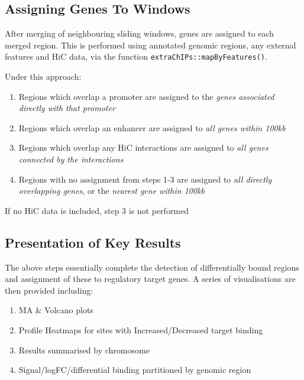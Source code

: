 \documentclass[
]{book}
\providecommand{\tightlist}{%
  \setlength{\itemsep}{0pt}\setlength{\parskip}{0pt}}
\begin{document}
\hypertarget{assigning-genes-to-windows}{%
\subsection*{Assigning Genes To Windows}\label{assigning-genes-to-windows}}

After merging of neighbouring sliding windows, genes are assigned to each merged region.
This is performed using annotated genomic regions, any external features and HiC data, via the function \texttt{extraChIPs::mapByFeatures()}.

Under this approach:

\begin{enumerate}
\def\labelenumi{\arabic{enumi}.}
\tightlist
\item
  Regions which overlap a promoter are assigned to the \emph{genes associated directly with that promoter}
\item
  Regions which overlap an enhancer are assigned to \emph{all genes within 100kb}
\item
  Regions which overlap any HiC interactions are assigned to \emph{all genes connected by the interactions}
\item
  Regions with no assignment from steps 1-3 are assigned to \emph{all directly overlapping genes}, or the \emph{nearest gene within 100kb}
\end{enumerate}

If no HiC data is included, step 3 is not performed

\hypertarget{presentation-of-key-results}{%
\subsection*{Presentation of Key Results}\label{presentation-of-key-results}}

The above steps essentially complete the detection of differentially bound regions and assignment of these to regulatory target genes.
A series of visualisations are then provided including:

\begin{enumerate}
\def\labelenumi{\arabic{enumi}.}
\tightlist
\item
  MA \& Volcano plots
\item
  Profile Heatmaps for sites with Increased/Decreased target binding
\item
  Results summarised by chromosome
\item
  Signal/logFC/differential binding partitioned by genomic region
\end{enumerate}
\end{document}
